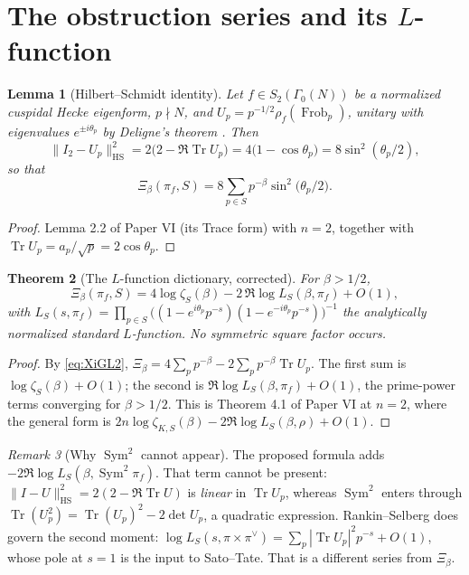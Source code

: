 \documentclass[11pt]{amsart}
\numberwithin{equation}{section}
\newtheorem{theorem}{Theorem}[section]
\newtheorem{lemma}[theorem]{Lemma}
\theoremstyle{definition}
\theoremstyle{remark}
\newtheorem{remark}[theorem]{Remark}
\newcommand{\Tr}{\operatorname{Tr}}
\newcommand{\HS}{\mathrm{HS}}
\newcommand{\Sym}{\operatorname{Sym}}
\newcommand{\Frob}{\operatorname{Frob}}
\begin{document}
\section{The obstruction series and its $L$-function}

\begin{lemma}[Hilbert--Schmidt identity]\label{lem:HS}
Let $f\in S_2(\Gamma_0(N))$ be a normalized cuspidal Hecke eigenform, $p\nmid N$, and
$U_p=p^{-1/2}\rho_f(\Frob_p)$, unitary with eigenvalues $e^{\pm i\theta_p}$ by Deligne's
theorem \cite{Deligne}. Then
\[
\bigl\|I_2-U_p\bigr\|_\HS^2=2\bigl(2-\Re\Tr U_p\bigr)=4\bigl(1-\cos\theta_p\bigr)=8\sin^2(\theta_p/2),
\]
so that
\begin{equation}\label{eq:XiGL2}
\Xi_\beta(\pi_f,S)=8\sum_{p\in S}p^{-\beta}\sin^2\!\bigl(\theta_p/2\bigr).
\end{equation}
\end{lemma}

\begin{proof}
Lemma 2.2 of Paper VI (its Trace form) with $n=2$, together with $\Tr U_p=a_p/\sqrt p=2\cos\theta_p$.
\end{proof}

\begin{theorem}[The $L$-function dictionary, corrected]\label{thm:L}
For $\beta>1/2$,
\begin{equation}\label{eq:Lcorrect}
\Xi_\beta(\pi_f,S)=4\log\zeta_S(\beta)-2\,\Re\log L_S(\beta,\pi_f)+O(1),
\end{equation}
with $L_S(s,\pi_f)=\prod_{p\in S}\bigl((1-e^{i\theta_p}p^{-s})(1-e^{-i\theta_p}p^{-s})\bigr)^{-1}$
the analytically normalized standard $L$-function. No symmetric square factor occurs.
\end{theorem}

\begin{proof}
By \eqref{eq:XiGL2}, $\Xi_\beta=4\sum_pp^{-\beta}-2\sum_pp^{-\beta}\Tr U_p$. The first sum is
$\log\zeta_S(\beta)+O(1)$; the second is $\Re\log L_S(\beta,\pi_f)+O(1)$, the prime-power
terms converging for $\beta>1/2$. This is Theorem 4.1 of Paper VI at $n=2$, where the general
form is $2n\log\zeta_{K,S}(\beta)-2\Re\log L_S(\beta,\rho)+O(1)$.
\end{proof}

\begin{remark}[Why $\Sym^2$ cannot appear]\label{rem:sym2}
The proposed formula adds $-2\Re\log L_S(\beta,\Sym^2\pi_f)$. That term cannot be present:
$\|I-U\|_\HS^2=2(2-\Re\Tr U)$ is \emph{linear} in $\Tr U_p$, whereas $\Sym^2$ enters through
$\Tr(U_p^2)=\Tr(U_p)^2-2\det U_p$, a quadratic expression. Rankin--Selberg does govern the
second moment: $\log L_S(s,\pi\times\pi^\vee)=\sum_p|\Tr U_p|^2p^{-s}+O(1)$, whose pole at
$s=1$ is the input to Sato--Tate. That is a different series from $\Xi_\beta$.
\end{remark}
\end{document}
